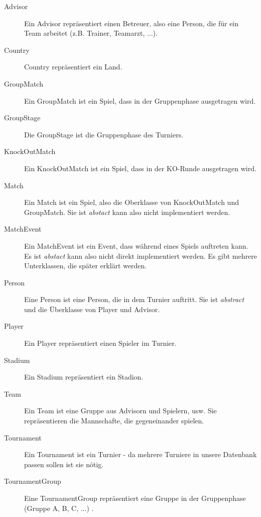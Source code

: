 \documentclass[11pt,german]{scrartcl}
\begin{document}
\begin{description}

\item [Advisor]
Ein Advisor repräsentiert einen Betreuer, also eine Person, die für ein Team arbeitet (z.B. Trainer, Teamarzt, ...).

\item [Country]
Country repräsentiert ein Land.

\item [GroupMatch]
Ein GroupMatch ist ein Spiel, dass in der Gruppenphase ausgetragen wird.

\item [GroupStage]
Die GroupStage ist die Gruppenphase des Turniers.

\item [KnockOutMatch]
Ein KnockOutMatch ist ein Spiel, dass in der KO-Runde ausgetragen wird.

\item [Match]
Ein Match ist ein Spiel, also die Oberklasse von KnockOutMatch und GroupMatch. Sie ist {\it abstact} kann also nicht implementiert werden.

\item [MatchEvent]
Ein MatchEvent ist ein Event, dass während eines Spiels auftreten kann. Es ist {\it abstact} kann also nicht direkt implementiert werden.
Es gibt mehrere Unterklassen, die später erklärt werden.

\item [Person]
Eine Person ist eine Person, die in dem Turnier auftritt. Sie ist {\it abstract} und die Überklasse von Player und Advisor.

\item [Player]
Ein Player repräsentiert einen Spieler im Turnier.

\item [Stadium]
Ein Stadium repräsentiert ein Stadion.

\item [Team]
Ein Team ist eine Gruppe aus Advisorn und Spielern, usw. Sie repräsentieren die Mannschafte, die gegeneinander spielen.

\item [Tournament]
Ein Tournament ist ein Turnier - da mehrere Turniere in unsere Datenbank passen sollen ist sie nötig.

\item [TournamentGroup]
Eine TournamentGroup repräsentiert eine Gruppe in der Gruppenphase (Gruppe A, B, C, ...) .

\end{description}
\end{document}
